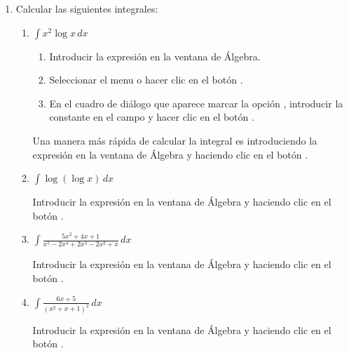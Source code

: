 \begin{enumerate}[leftmargin=*]
\item Calcular las siguientes integrales:
\begin{enumerate}
\item $ \int{x^2 \log x\,dx}$
\begin{indicacion}
\begin{enumerate}
\item Introducir la expresión  en la ventana de Álgebra.
\item Seleccionar el menu  o hacer clic en el botón .
\item En el cuadro de diálogo que aparece marcar la opción , introducir la constante  en el campo  y hacer clic en el botón .
\end{enumerate}
Una manera más rápida de calcular la integral es introduciendo la expresión  en la ventana de Álgebra y haciendo clic en el botón .
\end{indicacion}

\item $\int \log(\log x)\,dx$
\begin{indicacion}
Introducir la expresión  en la ventana de Álgebra y haciendo clic en el botón .
\end{indicacion}

\item $\displaystyle \int \frac{5x^{2}+4x+1}{x^{5}-2x^{4}+2x^{3}-2x^{2}+x}\,dx$
\begin{indicacion}
Introducir la expresión  en la ventana de Álgebra y haciendo clic en el botón .
\end{indicacion}

\item $\displaystyle \int \frac{6x+5}{(x^{2}+x+1)^{2}}\,dx$
\begin{indicacion}
Introducir la expresión  en la ventana de Álgebra y haciendo clic en el botón .
\end{indicacion}
\end{enumerate}



\end{enumerate}

